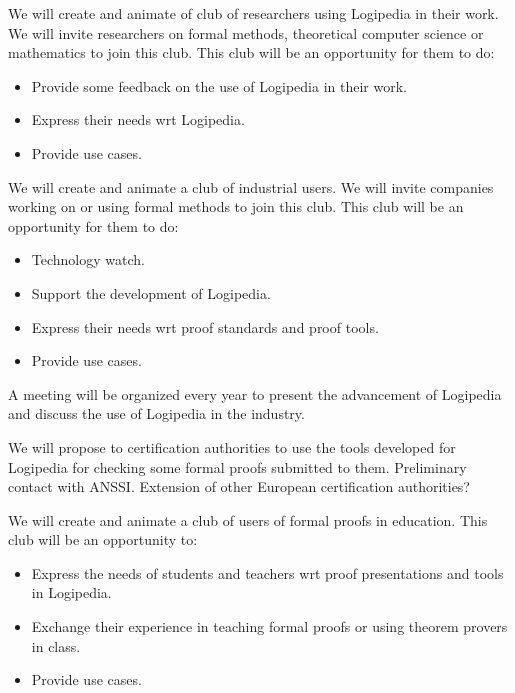 \begin{workpackage}[id=dissemination,wphases=0-48,type=MGT,
  short=Dissemination,%
  title={Dissemination, communication, and exploitation},
  lead=Inr,
  BolRM=3,
  InrRM=10]
\begin{tasklist}
  \begin{task}[id=research,title=Expanding the use of Logipedia in research]
    We will create and animate of club of researchers using Logipedia
    in their work. We will invite researchers on formal methods,
    theoretical computer science or mathematics to join this
    club. This club will be an opportunity for them to do:
    \begin{itemize}
    \item Provide some feedback on the use of Logipedia in their work.
    \item Express their needs wrt Logipedia.
    \item Provide use cases.
    \end{itemize}
  \end{task}

  \begin{task}[id=industry,title=Expanding the use of Logipedia in the industry]
    We will create and animate a club of industrial users. We will
    invite companies working on or using formal methods to join this
    club. This club will be an opportunity for them to do:
    \begin{itemize}
    \item Technology watch.
    \item Support the development of Logipedia.
    \item Express their needs wrt proof standards and proof tools.
    \item Provide use cases.
    \end{itemize}
    A meeting will be organized every year to present the advancement
    of Logipedia and discuss the use of Logipedia in the industry.
  \end{task}

  \begin{task}[id=certif,title=Expanding the use of Logipedia within certification authorities]
    We will propose to certification authorities to use the tools
    developed for Logipedia for checking some formal proofs submitted
    to them. Preliminary contact with ANSSI. Extension of other
    European certification authorities?
  \end{task}

  \begin{task}[id=education,title=Expanding the use of Logipedia in education]
    We will create and animate a club of users of formal proofs in
    education. This club will be an opportunity to:
    \begin{itemize}
    \item Express the needs of students and teachers wrt proof
      presentations and tools in Logipedia.
    \item Exchange their experience in teaching formal proofs or using
      theorem provers in class.
    \item Provide use cases.
    \end{itemize}
  \end{task}


\end{tasklist}
\end{workpackage}
